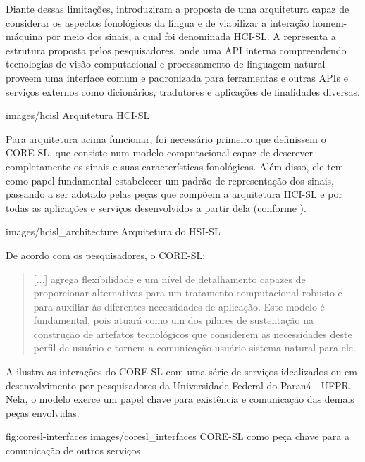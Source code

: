 Diante dessas limitações, \textcite{antunes-hcisl-2011} introduziram a proposta de uma arquitetura capaz de considerar os aspectos fonológicos da língua e de viabilizar a interação homem-máquina por meio dos sinais, a qual foi denominada HCI-SL. A  representa a estrutura proposta pelos pesquisadores, onde uma API interna compreendendo tecnologias de visão computacional e processamento de linguagem natural proveem uma interface comum e padronizada para ferramentas e outras APIs e serviços externos como dicionários, tradutores e aplicações de finalidades diversas.

    {images/hcisl}
    {Arquitetura HCI-SL \cite{antunes-hcisl-2011}}


Para arquitetura acima funcionar, foi necessário primeiro que \textcite{antunes-hcisl-2011} definissem o CORE-SL, que consiste num modelo computacional capaz de descrever completamente os sinais e suas características fonológicas. Além disso, ele tem como papel fundamental estabelecer um padrão de representação dos sinais, passando a ser adotado pelas peças que compõem a arquitetura HCI-SL e por todas as aplicações e serviços desenvolvidos a partir dela (conforme ). 
 
    {images/hcisl_architecture}
    {Arquitetura do HSI-SL}

De acordo com os pesquisadores, o CORE-SL:

\begin{quote}
[...] agrega flexibilidade e um nível de detalhamento capazes de proporcionar alternativas para um tratamento computacional robusto e para auxiliar às diferentes necessidades de aplicação. Este modelo é fundamental, pois atuará como um dos pilares de sustentação na construção de artefatos tecnológicos que considerem as necessidades deste perfil de usuário e tornem a comunicação usuário-sistema natural para ele. \cite{antunes-2011}
\end{quote}

 A  ilustra as interações do CORE-SL com uma série de serviços idealizados ou em desenvolvimento por pesquisadores da Universidade Federal do Paraná - UFPR. Nela, o modelo exerce um papel chave para existência e comunicação das demais peças envolvidas.

\image
    {fig:coresl-interfaces}
    {images/coresl_interfaces}
    {CORE-SL como peça chave para a comunicação de outros serviços}

